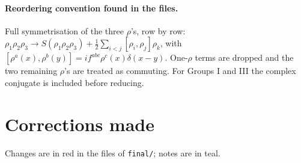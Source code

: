 \documentclass[10pt]{article}
\begin{document}
\paragraph{Reordering convention found in the files.} Full symmetrisation of the three $\rho$'s, row by row: $\rho_{1}\rho_{2}\rho_{3}\to S(\rho_{1}\rho_{2}\rho_{3})+\frac12\sum_{i<j}[\rho_{i},\rho_{j}]\rho_{k}$, with $[\rho^{a}(x),\rho^{b}(y)]=if^{abc}\rho^{c}(x)\delta(x-y)$. One-$\rho$ terms are dropped and the two remaining $\rho$'s are treated as commuting. For Groups I and III the complex conjugate is included before reducing.

\section{Corrections made}\label{sec:fixed}
Changes are in red in the files of \texttt{final/}; notes are in teal.
\end{document}
